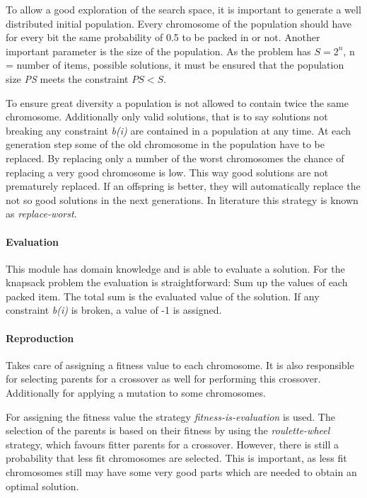 \documentclass[a4paper]{article}
\begin{document}
To allow a good exploration of the search space, it is important to generate a well distributed initial population. Every chromosome of the population should have for every bit the same probability of 0.5 to be packed in or not. Another important parameter is the size of the population. As the problem has \(S = 2^n\), n = number of items, possible solutions, it must be ensured that the population size \emph{PS} meets the constraint \(PS < S\). 

To ensure great diversity a population is not allowed to contain twice the same chromosome. Additionally only valid solutions, that is to say solutions not breaking any constraint \emph{b(i)} are contained in a population at any time. At each generation step some of the old chromosome in the population have to be replaced. By replacing only a number of the worst chromosomes the chance of replacing a very good chromosome is low. This way good solutions are not prematurely replaced. If an offspring is better, they will automatically replace the not so good solutions in the next generations. In literature this strategy is known as \emph{replace-worst}.

\paragraph{Evaluation}

This module has domain knowledge and is able to evaluate a solution. For the knapsack problem the evaluation is straightforward: Sum up the values of each packed item. The total sum is the evaluated value of the solution. If any constraint \emph{b(i)} is broken, a value of -1 is assigned. 

\paragraph{Reproduction}

Takes care of assigning a fitness value to each chromosome. It is also responsible for selecting parents for a crossover as well for performing this crossover. Additionally for applying a mutation to some chromosomes. 

For assigning the fitness value the strategy \emph{fitness-is-evaluation} is used. The selection of the parents is based on their fitness by using the \emph{roulette-wheel} strategy, which favours fitter parents for a crossover. However, there is still a probability that less fit chromosomes are selected. This is important, as less fit chromosomes still may have some very good parts which are needed to obtain an optimal solution. 
\end{document}
